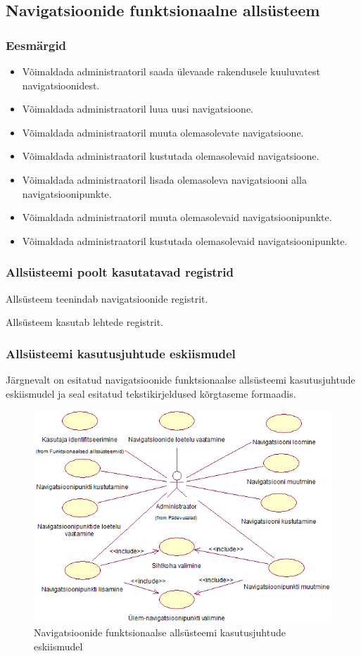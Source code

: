 \documentclass[a4paper,12pt]{article} %
\begin{document}
\subsection{Navigatsioonide funktsionaalne allsüsteem}
\subsubsection{Eesmärgid}
\begin{itemize}
\item Võimaldada administraatoril saada ülevaade rakendusele kuuluvatest navigatsioonidest.
\item Võimaldada administraatoril luua uusi navigatsioone.
\item Võimaldada administraatoril muuta olemasolevate navigatsioone.
\item Võimaldada administraatoril kustutada olemasolevaid navigatsioone.
\item Võimaldada administraatoril lisada olemasoleva navigatsiooni alla navigatsioonipunkte.
\item Võimaldada administraatoril muuta olemasolevaid navigatsioonipunkte.
\item Võimaldada administraatoril kustutada olemasolevaid navigatsioonipunkte.
\end{itemize}
\subsubsection{Allsüsteemi poolt kasutatavad registrid}
Allsüsteem teenindab navigatsioonide registrit.\par
Allsüsteem kasutab lehtede registrit.
\subsubsection{Allsüsteemi kasutusjuhtude eskiismudel}
Järgnevalt on esitatud navigatsioonide funktsionaalse allsüsteemi kasutusjuhtude eskiismudel ja seal esitatud tekstikirjeldused kõrgtaseme formaadis.
\begin{figure}[H]
\begin{center}
\includegraphics[bb=0 0 581 413,scale=1]{./diagrams/navigations-subsystem-use-case-digram.png}
\caption{Navigatsioonide funktsionaalse allsüsteemi kasutusjuhtude eskiismudel}
\end{center}
\end{figure}
\end{document}
